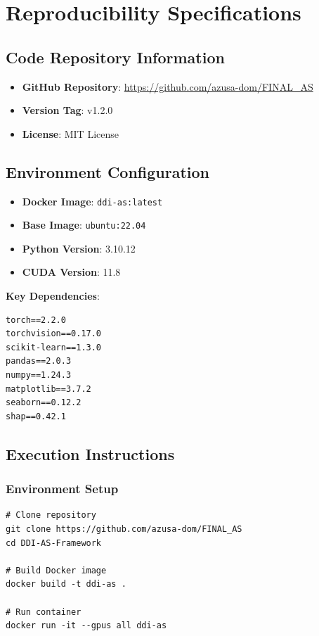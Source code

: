 \documentclass[12pt, a4paper]{article}
\begin{document}
\section{Reproducibility Specifications}
\subsection{Code Repository Information}
\begin{itemize}
    \item \textbf{GitHub Repository}: \url{https://github.com/azusa-dom/FINAL_AS}
    \item \textbf{Version Tag}: v1.2.0
    \item \textbf{License}: MIT License
\end{itemize}

\subsection{Environment Configuration}
\begin{itemize}
    \item \textbf{Docker Image}: \texttt{ddi-as:latest}
    \item \textbf{Base Image}: \texttt{ubuntu:22.04}
    \item \textbf{Python Version}: 3.10.12
    \item \textbf{CUDA Version}: 11.8
\end{itemize}
\textbf{Key Dependencies}:
\begin{verbatim}
torch==2.2.0
torchvision==0.17.0
scikit-learn==1.3.0
pandas==2.0.3
numpy==1.24.3
matplotlib==3.7.2
seaborn==0.12.2
shap==0.42.1
\end{verbatim}

\subsection{Execution Instructions}
\subsubsection{Environment Setup}
\begin{verbatim}
# Clone repository
git clone https://github.com/azusa-dom/FINAL_AS
cd DDI-AS-Framework

# Build Docker image
docker build -t ddi-as .

# Run container
docker run -it --gpus all ddi-as
\end{verbatim}
\end{document}
